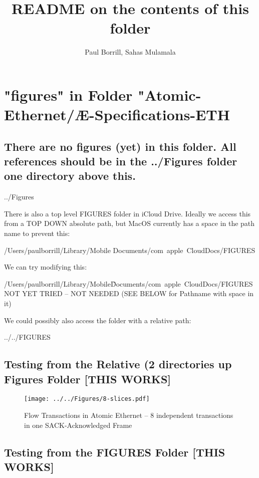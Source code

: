 \documentclass{tufte-handout}
\title{README on the contents of this folder}
\author{Paul Borrill, Sahas Mulamala}
\begin{document}
\maketitle


\section{"figures" in Folder "Atomic-Ethernet/Æ-Specifications-ETH}

\subsection{There are no figures (yet) in this folder.    All references should be in the {../Figures} folder one directory above this.}

	{../Figures}
	
There is also a top level FIGURES folder in iCloud Drive.  Ideally we access this from a TOP DOWN absolute path, but MacOS currently has a space in the path name to prevent this:

	/Users/paulborrill/Library/Mobile Documents/com~apple~CloudDocs/FIGURES
	
	We can try modifying this:
	
		/Users/paulborrill/Library/Mobile\~Documents/com~apple~CloudDocs/FIGURES	NOT YET TRIED -- NOT NEEDED (SEE BELOW for Pathname with space in it)
		
		
We could possibly also access the folder with a relative path:

	{../../FIGURES}



\subsection{Testing from the Relative (2 directories up Figures Folder [THIS WORKS]}

\begin{figure}[h]
\centering
\texttt{[image: ../../Figures/8-slices.pdf]}
\caption{Flow Transactions in Atomic Ethernet -- 8 independent transactions in one SACK-Acknowledged Frame}
\label{fig:Mathematica}
\end{figure}
	
\subsection{Testing from the FIGURES Folder [THIS WORKS]}
\end{document}
